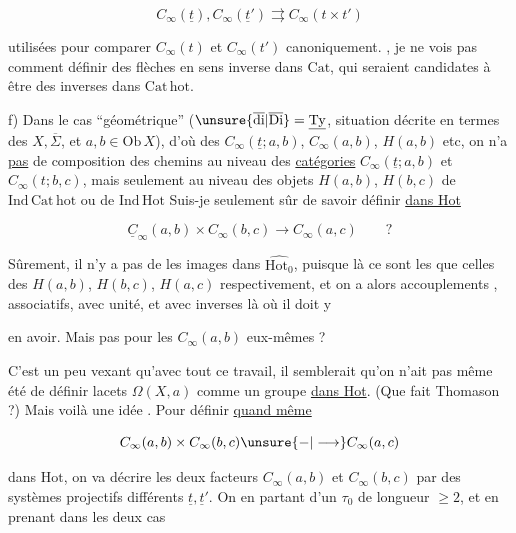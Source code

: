\[
C_\infty(\underline t),C_\infty(\underline t')\rightrightarrows C_\infty(t\times t')
\]

utilisées pour comparer $C_\infty(t)$ et $C_\infty(t')$ canoniquement. , je ne vois pas comment définir des flèches en sens inverse dans $\mathrm{Cat}$, qui seraient candidates à être des inverses dans $\mathrm{Cat\,hot}$.

f) Dans le cas ``géométrique'' ($\unsure{\overline{\mathrm{di}}|\overline{\mathrm{Di}}}=\underline{\mathrm{Ty}}$, situation décrite en termes des $X,\overline\Sigma$,  et $a,b\in\mathrm{Ob}\,X$), d'où des $C_\infty(\underline t;a,b)$, $C_\infty(a,b)$, $H(a,b)$ etc, on n'a \uline{pas}  de composition des chemins au niveau des \uline{catégories} $C_\infty(\underline t;a,b)$ et $C_\infty(t;b,c)$, mais seulement au niveau des objets  $H(a,b)$, $H(b,c)$ de $\mathrm{Ind\,Cat\,hot}$ ou de $\mathrm{Ind\,Hot}$ Suis-je seulement sûr de savoir définir \uline{dans Hot}

\[
\underline C_\infty(a,b)\times C_\infty(b,c)\longrightarrow C_\infty(a,c)\qquad ?
\]

Sûrement, il n'y a pas de   les images dans $\widehat{\mathrm{Hot}_0}$, puisque là ce sont les  que celles des $H(a,b)$, $H(b,c)$, $H(a,c)$ respectivement, et on a alors accouplements , associatifs, avec unité, et avec inverses  là où il doit y


en avoir.  Mais pas pour les $C_\infty(a,b)$ eux-mêmes ?

C'est un peu vexant qu'avec tout ce travail, il semblerait qu'on n'ait pas même été  de définir    lacets $\Omega(X,a)$ comme un groupe \uline{dans Hot}. (Que fait Thomason ?) Mais voilà une idée . Pour définir \uline{quand même}

\[
C_\infty(a,b)\times C_\infty(b,c)\unsure{-|\longrightarrow} C_\infty(a,c)
\]

dans $\mathrm{Hot}$, on va décrire les deux facteurs $C_\infty(a,b)$ et $C_\infty(b,c)$ par des systèmes projectifs différents $\underline t,\underline t'$. On   en partant d'un $\tau_0$ de longueur  $\geq2$, et en prenant dans les deux cas

